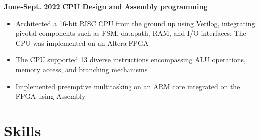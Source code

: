 \documentclass[11pt,a4paper,sans]{moderncv}
\begin{document}
\cventry
{\textnormal{\textbf{June-Sept. 2022}}}
{\textnormal{\textbf{CPU Design and Assembly programming}}}
{}{}{}
{
    \begin{itemize}
    \item Architected a 16-bit RISC CPU from the ground up using Verilog, integrating pivotal components such as FSM, datapath, RAM, and I/O interfaces. The CPU was implemented on an Altera FPGA
    \item The CPU supported 13 diverse instructions encompassing ALU operations, memory access, and branching mechanisms
    \item Implemented preemptive multitasking on an ARM core integrated on the FPGA using Assembly
\end{itemize}
}

\section{Skills}

\end{document}
